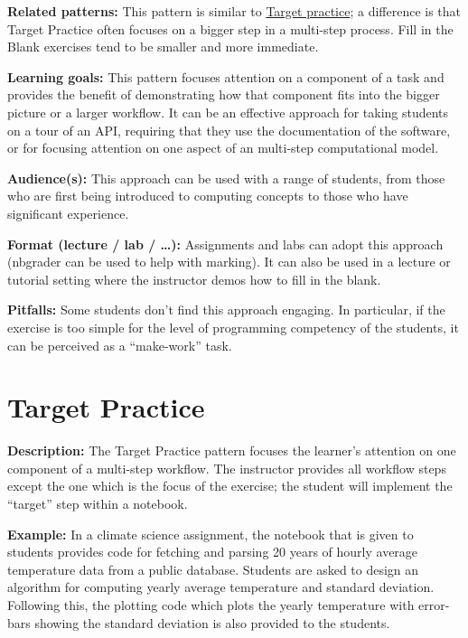 \documentclass[]{book}
\begin{document}
\textbf{Related patterns:}
This pattern is similar to \protect\hyperlink{target-practice}{Target practice}; a difference is that
Target Practice often focuses on a bigger step in a multi-step
process. Fill in the Blank exercises tend to be smaller and more
immediate.

\textbf{Learning goals:}
This pattern focuses attention on a component of a task and provides
the benefit of demonstrating how that component fits into the bigger
picture or a larger workflow. It can be an effective approach for
taking students on a tour of an API, requiring that they use the
documentation of the software, or for focusing attention on one aspect
of an multi-step computational model.

\textbf{Audience(s):}
This approach can be used with a range of students, from those who are
first being introduced to computing concepts to those who have
significant experience.

\textbf{Format (lecture / lab / \ldots):}
Assignments and labs can adopt this approach (nbgrader can be used to
help with marking). It can also be used in a lecture or tutorial
setting where the instructor demos how to fill in the blank.

\textbf{Pitfalls:}
Some students don't find this approach engaging. In particular, if the
exercise is too simple for the level of programming competency of the
students, it can be perceived as a ``make-work'' task.

\hypertarget{target-practice}{%
\section{Target Practice}\label{target-practice}}

\textbf{Description:}
The Target Practice pattern focuses the learner's attention on one component
of a multi-step workflow. The instructor provides all workflow steps except
the one which is the focus of the exercise; the student will implement the
``target'' step within a notebook.

\textbf{Example:}
In a climate science assignment, the notebook that is given to students
provides code for fetching and parsing 20 years of hourly average temperature
data from a public database. Students are asked to design an algorithm for computing
yearly average temperature and standard deviation. Following this, the plotting code
which plots the yearly temperature with error-bars showing the standard deviation
is also provided to the students.
\end{document}
